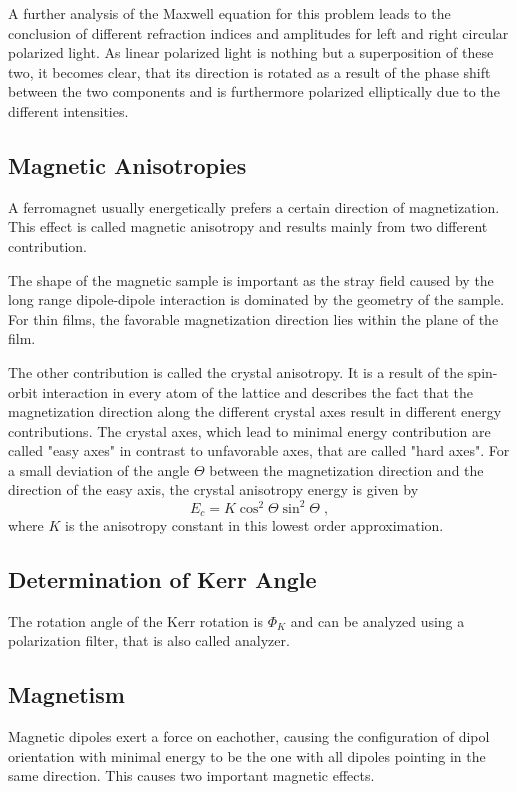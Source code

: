 \documentclass[a4paper]{scrartcl}
\numberwithin{equation}{section}
\numberwithin{figure}{section}
\numberwithin{table}{section}
\newcommand{\eq}[2]{\begin{equation}#1\label{#2}\end{equation}}
\begin{document}
A further analysis of the Maxwell equation for this problem \cite{book} leads to the conclusion of different refraction indices and amplitudes for left and right circular polarized light. As linear polarized light is nothing but a superposition of these two, it becomes clear, that its direction is rotated as a result of the phase shift between the two components and is furthermore polarized elliptically due to the different intensities. 


\subsection{Magnetic Anisotropies}
A ferromagnet usually energetically prefers a certain direction of magnetization. This effect is called magnetic anisotropy and results mainly from two different contribution. 

The shape of the magnetic sample is important as the stray field caused by the long range dipole-dipole interaction is dominated by the geometry of the sample. For thin films, the favorable magnetization direction lies within the plane of the film. 

The other contribution is called the crystal anisotropy. It is a result of the spin-orbit interaction in every atom of the lattice and describes the fact that the magnetization direction along the different crystal axes result in different energy contributions. The crystal axes, which lead to minimal energy contribution are called "easy axes" in contrast to unfavorable axes, that are called "hard axes". For a small deviation of the angle $\Theta$ between the magnetization direction and the direction of the easy axis, the crystal anisotropy energy is given by
\eq{E_c=K \cos^2 \Theta \sin^2 \Theta \; , }{aniso}
where $K$ is the anisotropy constant in this lowest order approximation.


\subsection{Determination of Kerr Angle}
The rotation angle of the Kerr rotation is $\Phi_K$ and can be analyzed using a polarization filter, that is also called analyzer.


\subsection{Magnetism}
Magnetic dipoles exert a force on eachother, causing the configuration of dipol orientation with minimal energy to be the one with all dipoles pointing in the same direction. This causes two important magnetic effects.
\end{document}

